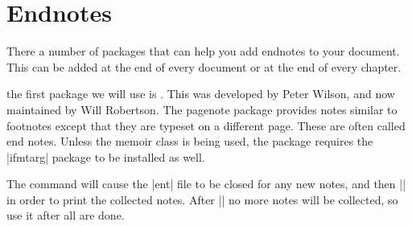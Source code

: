 \chapter{Endnotes}

There a number of packages that can help you add endnotes to your document.
This can be added at the end of every document or at the end of every chapter.

the first package we will use is . This was developed by Peter Wilson, 
and now maintained by Will Robertson. The pagenote package provides notes similar to footnotes except that
they are typeset on a different page. These are often called end notes.
Unless the memoir class is being used, the package requires the |ifmtarg|
package to be installed as well.



The  command will cause the |ent| file to be closed for any new
 notes, and then || in order to print the collected notes. After |\printnotes|
no more notes will be collected, so use it after all are done.

